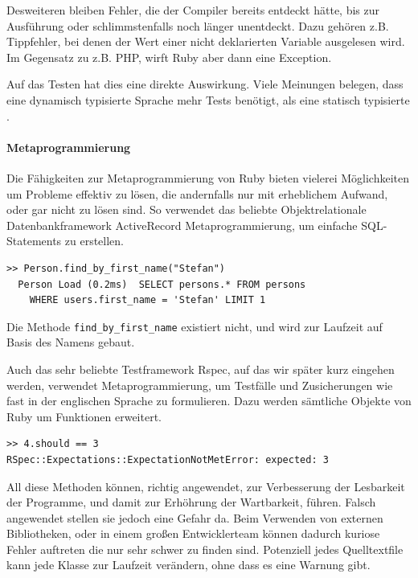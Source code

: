 Desweiteren bleiben Fehler, die der Compiler bereits entdeckt hätte, bis zur Ausführung oder schlimmstenfalls noch länger unentdeckt. Dazu gehören z.B. Tippfehler, bei denen der Wert einer nicht deklarierten Variable ausgelesen wird. Im Gegensatz zu z.B. PHP, wirft Ruby aber dann eine Exception.

Auf das Testen hat dies eine direkte Auswirkung. Viele Meinungen belegen, dass eine dynamisch typisierte Sprache mehr Tests benötigt, als eine statisch typisierte \citep{daniel_spiewak_dynamic_2010}. 



\paragraph{Metaprogrammierung}
Die Fähigkeiten zur Metaprogrammierung von Ruby bieten vielerei Möglichkeiten um Probleme effektiv zu lösen, die andernfalls nur mit erheblichem Aufwand, oder gar nicht zu lösen sind. So verwendet das beliebte Objektrelationale Datenbankframework ActiveRecord Metaprogrammierung, um einfache SQL-Statements zu erstellen.
\begin{lstlisting}
>> Person.find_by_first_name("Stefan")
  Person Load (0.2ms)  SELECT persons.* FROM persons
    WHERE users.first_name = 'Stefan' LIMIT 1
\end{lstlisting}

Die Methode \texttt{find\_by\_first\_name} existiert nicht, und wird zur Laufzeit auf Basis des Namens gebaut.

Auch das sehr beliebte Testframework Rspec, auf das wir später kurz eingehen werden, verwendet Metaprogrammierung, um Testfälle und Zusicherungen wie fast in der englischen Sprache zu formulieren. Dazu werden sämtliche Objekte von Ruby um Funktionen erweitert.

\begin{lstlisting}
>> 4.should == 3
RSpec::Expectations::ExpectationNotMetError: expected: 3
\end{lstlisting}

All diese Methoden können, richtig angewendet, zur Verbesserung der Lesbarkeit der Programme, und damit zur Erhöhrung der Wartbarkeit, führen.
Falsch angewendet stellen sie jedoch eine Gefahr da. Beim Verwenden von externen Bibliotheken, oder in einem großen Entwicklerteam können dadurch kuriose Fehler auftreten die nur sehr schwer zu finden sind. Potenziell jedes Quelltextfile kann jede Klasse zur Laufzeit verändern, ohne dass es eine Warnung gibt. 

